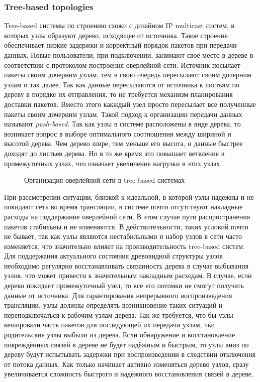 		\subsubsection{Tree-based topologies}
		Tree-based системы по строению схожи с дизайном IP multicast систем, в которых узлы образуют дерево, исходящее
		от источника. Такое строение обеспечивает низкие задержки и корректный порядок пакетов при передачи данных.
		Новые пользователи, при подключении, занимают своё место в дереве в соответствии с протоколом построения
		оверлейной сети. Источник посылает пакеты своим дочерним узлам, тем в свою очередь пересылают своим дочерним
		узлам и так далее. Так как данные пересылаются от источника к листьям по дереву в порядке их отправления, то не
		требуется механизм планирования доставки пакетов. Вместо этого какждый узел просто пересылает все полученные
		пакеты своим дочерним узлам. Такой подход к организации передачи данных называют \textit{push-based}. Так как
		узлы в системе расположены в виде дерева, то возникает вопрос в выборе оптимального соотношения между шириной и
		высотой дерева. Чем дерево шире, тем меньше его высота, и данные быстрее доходят до листьев дерева. Но в то же
		время это повышает ветвление в промежуточных узлах, что означает увеличение нагрузки в этих узлах.

		\begin{figure}[h]
			\caption{Организация оверлейной сети в tree-based системах}
			\label{img:tree-based-system}
		\end{figure}

		При рассмотрении ситуации, близкой к идеальной, в которой узлы надёжны и не покидают сеть во время трансляции,
		в системе почти отсутствуют накладные расходы на поддержание оверлейной сети. В этом случае пути распространения
		пакетов стабильны и не изменяются. В действительности, таких условий почти не бывает, так как узлы являются
		нестабильными и набор узлов в сети часто изменяется, что значительно влияет на производительность tree-based
		систем. Для поддержания актуального состояния древовидной структуры узлов необходимо регулярно восстанавливать
		связанность дерева в случае выбывания узлов, что может привести к значительным накладным расходам. В случае,
		если дерево покидает промежуточный узел, то все его потомки не смогут получать данные от источника. Для
		гарантирования непрерывного воспроизведения трансляции, узлы должны определять возникновение таких ситуаций и
		переподключаться к рабочим узлам дерева. Так же требуется, что бы узлы кешировали часть пакетов для последующей
		их передачи узлам, чьи родительские узлы выбыли из дерева. Если обнаружение и восстановление повреждённых связей
		в дереве не будет надёжным и быстрым, то узлы вниз по дереву будут испытывать задержки при воспроизведении в
		следствии отключения от потока данных. Как только начинает активно изменяться дерево узлов, сразу увеличивается
		сложность быстрого и надёжного восстановления связей в дереве.

